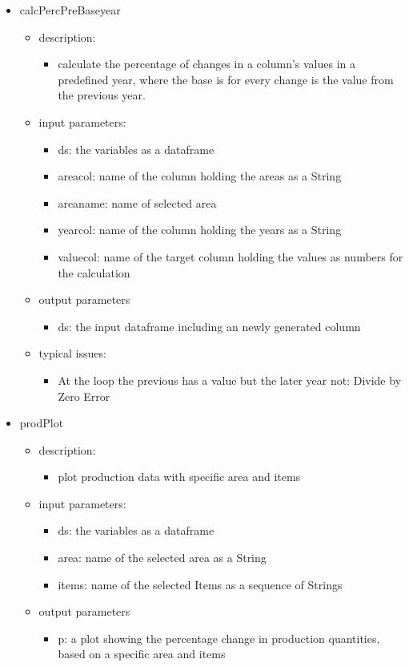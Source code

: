 \documentclass[11pt]{article}
\begin{document}
\begin{itemize}
\item calcPercPreBaseyear  
	\begin{itemize}
	\item description: 
		\begin{itemize}
		\item calculate the percentage of changes in a column's values in a predefined year, where the base is for every change is the value from the previous year.
		\end{itemize}
	\item input parameters: 
		\begin{itemize}
		\item ds: the variables as a dataframe
		\item areacol: name of the column holding the areas  as a String
		\item areaname: name of selected area
  		\item yearcol: name of the column holding the years as a String 
		\item valuecol:  name of the target column holding the values as numbers for the calculation
		\end{itemize}
	\item output parameters
		\begin{itemize}
		\item ds: the input dataframe including an newly generated column 
		\end{itemize}
	\item typical issues:
		\begin{itemize}
		\item At the loop the previous has a value but the later year not: Divide by Zero Error
		\end{itemize}
	\end{itemize}

\item prodPlot   
	\begin{itemize}
	\item description: 
		\begin{itemize}
		\item plot production data with specific area and items
		\end{itemize}
	\item input parameters: 
		\begin{itemize}
		\item ds: the variables as a dataframe
		\item area: name of the selected area as a String
		\item items: name of the selected Items as a sequence of Strings
		\end{itemize}
	\item output parameters
		\begin{itemize}
		\item p: a plot showing the percentage change in production quantities, based on a specific area and items
		\end{itemize}
	\end{itemize}


\end{itemize}
\end{document}
